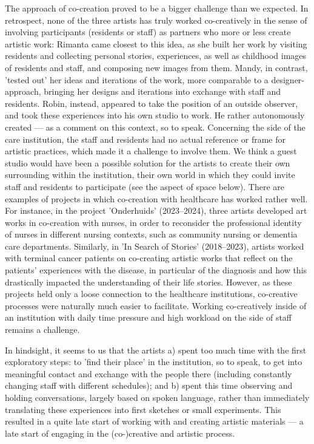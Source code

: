 \documentclass[authordate, empirical]{jote-new-article}
\begin{document}
	The approach of co-creation proved to be a bigger challenge than we expected. In retrospect, none of the three artists has truly worked co-creatively in the sense of involving participants (residents or staff) as partners who more or less create artistic work: Rimanta came closest to this idea, as she built her work by visiting residents and collecting personal stories, experiences, as well as childhood images of residents and staff, and composing new images from them. Mandy, in contrast, 'tested out' her ideas and iterations of the work, more comparable to a designer-approach, bringing her designs and iterations into exchange with staff and residents. Robin, instead, appeared to take the position of an outside observer, and took these experiences into his own studio to work. He rather autonomously created --- as a comment on this context, so to speak. Concerning the side of the care institution, the staff and residents had no actual reference or frame for artistic practices, which made it a challenge to involve them. We think a guest studio would have been a possible solution for the artists to create their own surrounding within the institution, their own world in which they could invite staff and residents to participate (see the aspect of space below). There are examples of projects in which co-creation with healthcare has worked rather well. For instance, in the project 'Onderhuids' (2023--2024), three artists developed art works in co-creation with nurses, in order to reconsider the professional identity of nurses in different nursing contexts, such as community nursing or dementia care departments. Similarly, in 'In Search of Stories' (2018--2023), artists worked with terminal cancer patients on co-creating artistic works that reflect on the patients' experiences with the disease, in particular of the diagnosis and how this drastically impacted the understanding of their life stories. However, as these projects held only a loose connection to the healthcare institutions, co-creative processes were naturally much easier to facilitate. Working co-creatively inside of an institution with daily time pressure and high workload on the side of staff remains a challenge.







	In hindsight, it seems to us that the artists a) spent too much time with the first exploratory steps: to 'find their place' in the institution, so to speak, to get into meaningful contact and exchange with the people there (including constantly changing staff with different schedules); and b) spent this time observing and holding conversations, largely based on spoken language, rather than immediately translating these experiences into first sketches or small experiments. This resulted in a quite late start of working with and creating artistic materials — a late start of engaging in the (co-)creative and artistic process.
\end{document}
